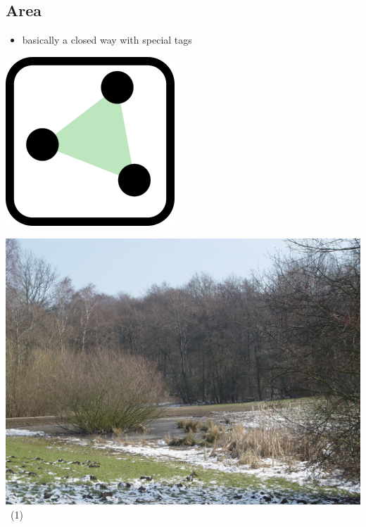 \documentclass{beamer}
\begin{document}
	\subsection{Area}
	
	\begin{frame}
		\begin{itemize}
			\item basically a closed way with special tags
		\end{itemize}
		
		\vfill
		
		\begin{center}
			\begin{minipage}[b][0.6\textheight][c]{0.2\linewidth}
				\centering
				\includegraphics[width=0.5\linewidth,height=0.5\textheight,keepaspectratio]{images/240px-Mf_area.png}
			\end{minipage}
			\begin{minipage}[b][0.6\textheight][c]{0.4\linewidth}
				\centering
				\includegraphics[width=0.8\linewidth,height=0.8\textheight,keepaspectratio]{images/Stellinger_Feldmark_ESE_01.JPG}~\tiny{(1)}
			\end{minipage}

\end{center}
\end{frame}
\end{document}

